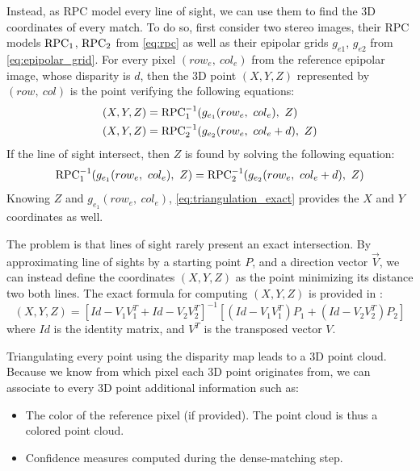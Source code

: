 Instead, as RPC model every line of sight, we can use them to find the 3D coordinates of every match. To do so, first consider two stereo images, their RPC models $\mathrm{RPC}_1$, $\mathrm{RPC}_2$ from \cref{eq:rpc} as well as their epipolar grids $g_{e1}$, $g_{e2}$ from \cref{eq:epipolar_grid}. For every pixel $(row_e, ~col_e)$ from the reference epipolar image, whose disparity is $d$, then the 3D point $(X, Y, Z)$ represented by $(row, ~col)$ is the point verifying the following equations:
\begin{align}
    (X, Y, Z) &= \mathrm{RPC}^{-1}_1(g_{e_1}(row_e,~col_e),~Z)\label{eq:triangulation_exact}\\
    (X, Y, Z) &= \mathrm{RPC}^{-1}_2(g_{e_2}(row_e,~col_e+d),~Z) 
\end{align}
If the line of sight intersect, then $Z$ is found by solving the following equation:
\begin{equation}
     \mathrm{RPC}^{-1}_1(g_{e_1}(row_e,~col_e),~Z) = \mathrm{RPC}^{-1}_2(g_{e_2}(row_e,~col_e+d),~Z) 
\end{equation}
Knowing $Z$ and $g_{e_1}(row_e,~col_e)$, \cref{eq:triangulation_exact} provides the $X$ and $Y$ coordinates as well.

The problem is that lines of sight rarely present an exact intersection. By approximating line of sights by a starting point $P$, and a direction vector $\overrightarrow{V}$, we can instead define the coordinates $(X,Y,Z)$ as the point minimizing its distance two both lines. The exact formula for computing $(X,Y,Z)$ is provided in \cite{delvit_geometric_2006}:
\begin{equation}
    (X,Y,Z) = \left[ Id - V_1V_1^T + Id - V_2V_2^T \right]^{-1} \left[ (Id - V_1V_1^T)P_1 + (Id - V_2V_2^T)P_2 \right]
\end{equation}
where $Id$ is the identity matrix, and $V^T$ is the transposed vector $V$.

Triangulating every point using the disparity map leads to a 3D point cloud. Because we know from which pixel each 3D point originates from, we can associate to every 3D point additional information such as:
\begin{itemize}
    \item The color of the reference pixel (if provided). The point cloud is thus a colored point cloud.
    \item Confidence measures computed during the dense-matching step. 
\end{itemize}


